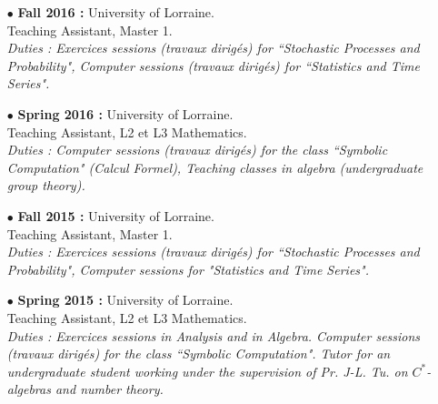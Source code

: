 \documentclass[a4paper]{article}
\begin{document}
\begin{itemize}
\item[$\bullet$] \textbf{ Fall 2016 :} University of Lorraine.\\
					Teaching Assistant, Master 1.\\
					\textit{Duties : Exercices sessions (travaux dirigés) for ``Stochastic Processes and Probability", Computer sessions (travaux dirigés) for ``Statistics and Time Series".}\\

\item[$\bullet$] \textbf{ Spring 2016 :} University of Lorraine.\\	
					Teaching Assistant, L2 et L3 Mathematics. \\
					\textit{Duties : Computer sessions (travaux dirigés) for the class ``Symbolic Computation" (Calcul Formel), Teaching classes in algebra (undergraduate group theory).}\\  
 
\item[$\bullet$] \textbf{ Fall 2015 :} University of Lorraine.\\
					Teaching Assistant, Master 1.\\
					\textit{Duties : Exercices sessions (travaux dirigés) for ``Stochastic Processes and Probability", Computer sessions for "Statistics and Time Series".}\\

\item[$\bullet$] \textbf{ Spring 2015 :} University of Lorraine.\\	
					Teaching Assistant, L2 et L3 Mathematics. \\
					\textit{Duties : Exercices sessions in Analysis and in Algebra. Computer sessions (travaux dirigés) for the class ``Symbolic Computation". Tutor for an undergraduate student working under the supervision of Pr. J-L. Tu. on $C^*$-algebras and number theory.}\\   
					

\end{itemize}
\end{document}
